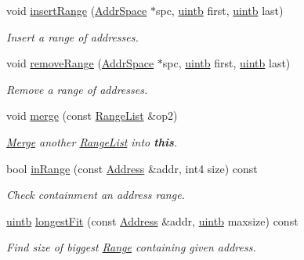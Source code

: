 \begin{DoxyCompactItemize}
void \mbox{\hyperlink{class_range_list_ab0ab4e29f9f3b6b096e985d99daac763}{insert\+Range}} (\mbox{\hyperlink{class_addr_space}{Addr\+Space}} $\ast$spc, \mbox{\hyperlink{types_8h_a2db313c5d32a12b01d26ac9b3bca178f}{uintb}} first, \mbox{\hyperlink{types_8h_a2db313c5d32a12b01d26ac9b3bca178f}{uintb}} last)
\begin{DoxyCompactList}\small\item\em Insert a range of addresses. \end{DoxyCompactList}\item 
void \mbox{\hyperlink{class_range_list_a25b0feea38aa56d2502426d117dccb31}{remove\+Range}} (\mbox{\hyperlink{class_addr_space}{Addr\+Space}} $\ast$spc, \mbox{\hyperlink{types_8h_a2db313c5d32a12b01d26ac9b3bca178f}{uintb}} first, \mbox{\hyperlink{types_8h_a2db313c5d32a12b01d26ac9b3bca178f}{uintb}} last)
\begin{DoxyCompactList}\small\item\em Remove a range of addresses. \end{DoxyCompactList}\item 
void \mbox{\hyperlink{class_range_list_abdacecedb9b17b6a1b67f3f3d1d192e2}{merge}} (const \mbox{\hyperlink{class_range_list}{Range\+List}} \&op2)
\begin{DoxyCompactList}\small\item\em \mbox{\hyperlink{class_merge}{Merge}} another \mbox{\hyperlink{class_range_list}{Range\+List}} into {\bfseries{this}}. \end{DoxyCompactList}\item 
bool \mbox{\hyperlink{class_range_list_a61b4034c6930b45dd8d365c382c73b86}{in\+Range}} (const \mbox{\hyperlink{class_address}{Address}} \&addr, int4 size) const
\begin{DoxyCompactList}\small\item\em Check containment an address range. \end{DoxyCompactList}\item 
\mbox{\hyperlink{types_8h_a2db313c5d32a12b01d26ac9b3bca178f}{uintb}} \mbox{\hyperlink{class_range_list_a01e1b36438b8366c0750f69080193271}{longest\+Fit}} (const \mbox{\hyperlink{class_address}{Address}} \&addr, \mbox{\hyperlink{types_8h_a2db313c5d32a12b01d26ac9b3bca178f}{uintb}} maxsize) const
\begin{DoxyCompactList}\small\item\em Find size of biggest \mbox{\hyperlink{class_range}{Range}} containing given address. \end{DoxyCompactList}\item 

\end{DoxyCompactItemize}
